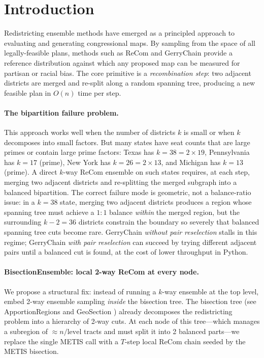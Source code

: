\section{Introduction}
\label{sec:intro}

Redistricting ensemble methods have emerged as a principled approach to
evaluating and generating congressional maps. By sampling from the space of
all legally-feasible plans, methods such as ReCom \citep{deford2021recombination}
and GerryChain \citep{duchin2019gerrychain} provide a reference distribution
against which any proposed map can be measured for partisan or racial bias.
The core primitive is a \emph{recombination step}: two adjacent districts are
merged and re-split along a random spanning tree, producing a new feasible plan
in $O(n)$ time per step.

\paragraph{The bipartition failure problem.}
This approach works well when the number of districts $k$ is small or when
$k$ decomposes into small factors. But many states have seat counts that are
large primes or contain large prime factors: Texas has $k = 38 = 2 \times 19$,
Pennsylvania has $k = 17$ (prime), New York has $k = 26 = 2 \times 13$,
and Michigan has $k = 13$ (prime). A direct $k$-way ReCom ensemble on such
states requires, at each step, merging two adjacent districts and re-splitting
the merged subgraph into a balanced bipartition. The correct failure mode is
geometric, not a balance-ratio issue: in a $k=38$ state, merging two adjacent
districts produces a region whose spanning tree must achieve a $1:1$ balance
\emph{within} the merged region, but the surrounding $k-2 = 36$ districts
constrain the boundary so severely that balanced spanning tree cuts become rare.
GerryChain \emph{without pair reselection} stalls in this regime; GerryChain
\emph{with pair reselection} can succeed by trying different adjacent pairs
until a balanced cut is found, at the cost of lower throughput in Python.

\paragraph{BisectionEnsemble: local 2-way ReCom at every node.}
We propose a structural fix: instead of running a $k$-way ensemble at the top
level, embed 2-way ensemble sampling \emph{inside} the bisection tree. The
bisection tree (see ApportionRegions \citep{dellaLibera2026apportion} and
GeoSection \citep{dellaLibera2026geosection}) already decomposes the redistricting
problem into a hierarchy of 2-way cuts. At each node of this tree---which
manages a subregion of $\approx n/\text{level}$ tracts and must split it into
2 balanced parts---we replace the single METIS call with a $T$-step local
ReCom chain seeded by the METIS bisection.

